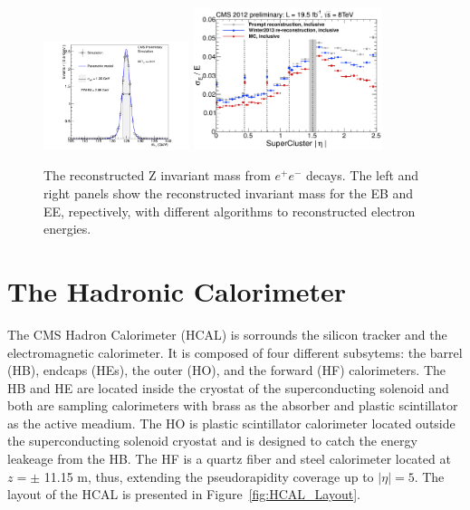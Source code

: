 \begin{figure}
 \centering
\includegraphics[width=0.38\textwidth]{CMS_DetectorFigures/ECAL_HiggsMassRes.pdf}
\includegraphics[width=0.49\textwidth]{CMS_DetectorFigures/EcalScaleEta_Incl.png}
\caption{The reconstructed Z invariant mass from $e^{+}e^{-}$
  decays. The left and right panels show the reconstructed invariant mass for
  the EB and EE, repectively, with different algorithms to reconstructed electron energies.\label{fig:ECAL_Higgs}}
\end{figure}
\section{The Hadronic Calorimeter}
The CMS Hadron Calorimeter (HCAL) is sorrounds the silicon tracker and
the electromagnetic calorimeter. It is composed of four different
subsytems: the barrel (HB), endcaps (HEs), the outer (HO), and the
forward (HF) calorimeters. The HB and HE are located inside the
cryostat of the superconducting solenoid and both are sampling
calorimeters with brass as the absorber and plastic scintillator as
the active meadium. The HO is plastic scintillator calorimeter located outside the superconducting
solenoid cryostat and is designed to catch the energy leakeage from
the HB. The HF is a quartz fiber and steel calorimeter located at $z
=\pm$ 11.15 m, thus, extending the pseudorapidity coverage up to
$|\eta| = 5$. The layout of the HCAL is presented in
Figure~\ref{fig:HCAL_Layout}.

